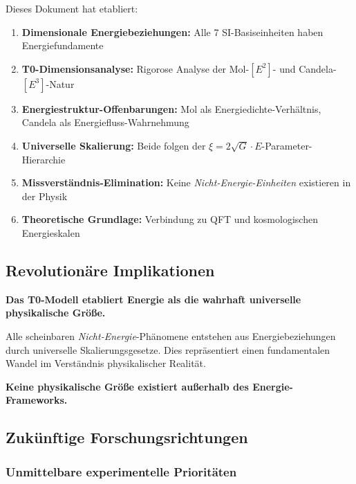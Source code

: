 \documentclass[12pt,a4paper]{article}
\newcommand{\xipar}{\xi}
\begin{document}
	Dieses Dokument hat etabliert:
	
	\begin{enumerate}
		\item \textbf{Dimensionale Energiebeziehungen:} Alle 7 SI-Basiseinheiten haben Energiefundamente
		\item \textbf{T0-Dimensionsanalyse:} Rigorose Analyse der Mol-$[E^2]$- und Candela-$[E^3]$-Natur
		\item \textbf{Energiestruktur-Offenbarungen:} Mol als Energiedichte-Verhältnis, Candela als Energiefluss-Wahrnehmung
		\item \textbf{Universelle Skalierung:} Beide folgen der $\xipar = 2\sqrt{G} \cdot E$-Parameter-Hierarchie
		\item \textbf{Missverständnis-Elimination:} Keine \textit{Nicht-Energie-Einheiten} existieren in der Physik
		\item \textbf{Theoretische Grundlage:} Verbindung zu QFT und kosmologischen Energieskalen
	\end{enumerate}
	
	\subsection{Revolutionäre Implikationen}
	\label{subsec:revolutionaere_implikationen}
	
	\begin{tcolorbox}[colback=red!5!white,colframe=red!75!black,title=Paradigmenwechsel: Universelle Energiephysik]
		\textbf{Das T0-Modell etabliert Energie als die wahrhaft universelle physikalische Größe.}
		
		Alle scheinbaren \textit{Nicht-Energie}-Phänomene entstehen aus Energiebeziehungen durch universelle Skalierungsgesetze. Dies repräsentiert einen fundamentalen Wandel im Verständnis physikalischer Realität.
		
		\textbf{Keine physikalische Größe existiert außerhalb des Energie-Frameworks.}
	\end{tcolorbox}
	
	\subsection{Zukünftige Forschungsrichtungen}
	\label{subsec:zukuenftige_forschung}
	
	\subsubsection{Unmittelbare experimentelle Prioritäten}
	\label{subsubsec:unmittelbare_experimentelle}
	
\end{document}
